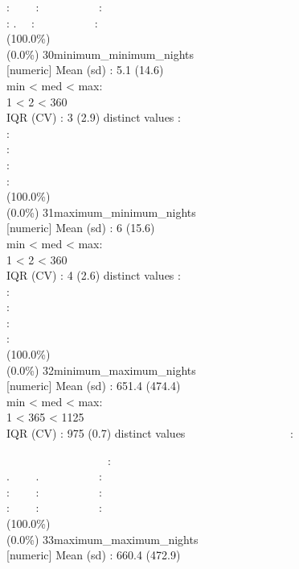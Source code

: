 \documentclass[
  journal,
]{IEEEtran}%
\begin{document}
: ~~~~: ~~~~~~~~~~:\\
: . ~~: ~~~~~~~~~~: \\
(100.0\%) \\
(0.0\%) \textbar{} \textbar{} 30\textbar minimum\_minimum\_nights\\
{[}numeric{]} \textbar Mean (sd) : 5.1 (14.6)\\
min \textless{} med \textless{} max:\\
1 \textless{} 2 \textless{} 360\\
IQR (CV) : 3 (2.9)  distinct values \textbar{} \textbar:\\
:\\
:\\
:\\
: \\
(100.0\%) \\
(0.0\%) \textbar{} \textbar{} 31\textbar maximum\_minimum\_nights\\
{[}numeric{]} \textbar Mean (sd) : 6 (15.6)\\
min \textless{} med \textless{} max:\\
1 \textless{} 2 \textless{} 360\\
IQR (CV) : 4 (2.6)  distinct values \textbar{} \textbar:\\
:\\
:\\
:\\
: \\
(100.0\%) \\
(0.0\%) \textbar{} \textbar{} 32\textbar minimum\_maximum\_nights\\
{[}numeric{]} \textbar Mean (sd) : 651.4 (474.4)\\
min \textless{} med \textless{} max:\\
1 \textless{} 365 \textless{} 1125\\
IQR (CV) : 975 (0.7)  distinct values \textbar{}
\textbar~~~~~~~~~~~~~~~~~~:\\
\strut ~~~~~~~~~~~~~~~~~~:\\
. ~~~~. ~~~~~~~~~~:\\
: ~~~~: ~~~~~~~~~~:\\
: ~~~~: ~~~~~~~~~~: \\
(100.0\%) \\
(0.0\%) \textbar{} \textbar{} 33\textbar maximum\_maximum\_nights\\
{[}numeric{]} \textbar Mean (sd) : 660.4 (472.9)\\
\end{document}
